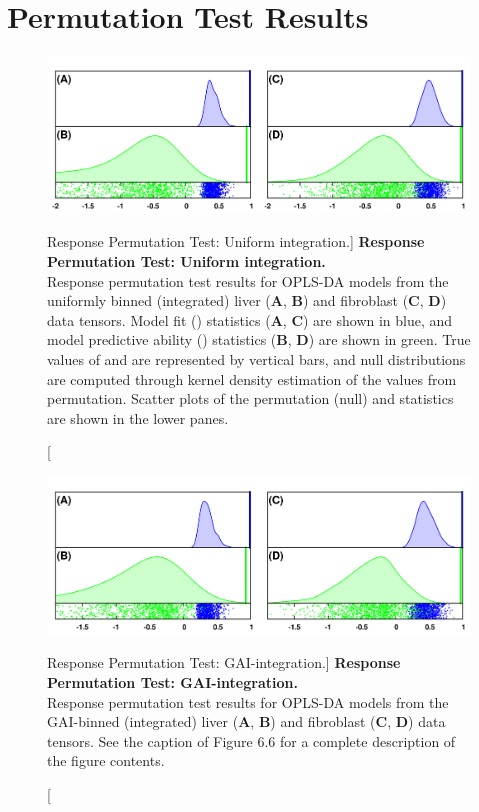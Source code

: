 \section{Permutation Test Results}

\begin{figure}[ht!]
\includegraphics[width=6.5in]{figs/gaibin/06.png}
\caption
      [Response Permutation Test: Uniform integration.]{
  {\bf Response Permutation Test: Uniform integration.}
  \\
  Response permutation test results for OPLS-DA models from the uniformly
  binned (integrated) liver ({\bf A}, {\bf B}) and fibroblast
  ({\bf C}, {\bf D}) data tensors. Model fit (\rsqy{}) statistics
  ({\bf A}, {\bf C}) are shown in blue, and model predictive ability (\qsq{})
  statistics ({\bf B}, {\bf D}) are shown in green. True values of \rsqy{} and
  \qsq{} are represented by vertical bars, and null distributions are computed
  through kernel density estimation of the values from permutation. Scatter
  plots of the permutation (null) \rsqy{} and \qsq{} statistics are shown in
  the lower panes.
}
\end{figure}

\begin{figure}[ht!]
\includegraphics[width=6.5in]{figs/gaibin/07.png}
\caption
      [Response Permutation Test: GAI-integration.]{
  {\bf Response Permutation Test: GAI-integration.}
  \\
  Response permutation test results for OPLS-DA models from the GAI-binned
  (integrated) liver ({\bf A}, {\bf B}) and fibroblast
  ({\bf C}, {\bf D}) data tensors. See the caption of Figure 6.6 for a
  complete description of the figure contents.
}
\end{figure}

